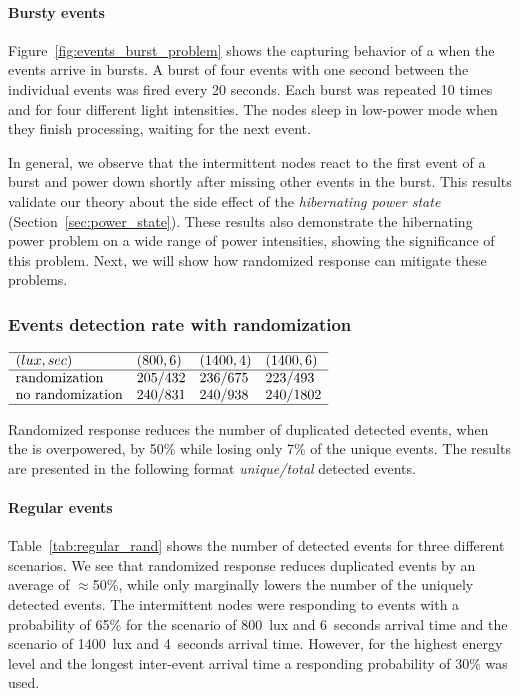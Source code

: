 \paragraph{Bursty events}
Figure~\ref{fig:events_burst_problem} shows the capturing behavior of a \sys when the events arrive in bursts. A burst of four events with one second between the individual events was fired every 20 seconds. Each burst was repeated 10 times and for four different light intensities. The nodes sleep in low-power mode when they finish processing, waiting for the next event. 

In general, we observe that the intermittent nodes react to the first event of a burst and power down shortly after missing other events in the burst. This results validate our theory about the side effect of the \textit{hibernating power state} (Section~\ref{sec:power_state}). These results also demonstrate the hibernating power problem on a wide range of power intensities, showing the significance of this problem. Next, we will show how randomized response can mitigate these problems. 

\subsubsection{Events detection rate with randomization}
\begin{table}
	\centering
    $
    \begin{array}{llll}\hline
     (lux,sec) & (800,6) & (1400,4) &(1400,6)\\\hline
    \text{randomization} &  205/432 & 236/675 & 223/493 \\
    \text{no randomization} & 240/831 &  240/938 & 240/1802 \\\hline
    \end{array}
    $
    \caption{Randomized response reduces the number of duplicated detected events,  when the \sys is overpowered, by 50\% while losing only 7\% of the unique events. The results are presented in the following format \textit{unique/total} detected events.}
    \label{tab:regular_rand}
\end{table}
%
\paragraph{Regular events} Table~\ref{tab:regular_rand} shows the number of detected events for three different scenarios. We see that randomized response reduces duplicated events by an average of $\approx$50\%, while only marginally lowers the number of the uniquely detected events. The intermittent nodes were responding to events with a probability of 65\% for the scenario of \SI{800}{lux} and \SI{6}{seconds} arrival time and the scenario of \SI{1400}{lux} and \SI{4}{seconds} arrival time. However, for the highest energy level and the longest inter-event arrival time a responding probability of 30\% was used.

